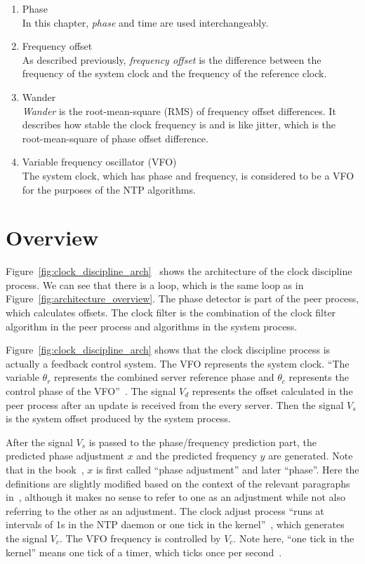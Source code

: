\begin{enumerate}
    \item Phase\\
        In this chapter, \emph{phase} and time are used interchangeably.
    \item Frequency offset\\
        As described previously, \emph{frequency offset} is the difference
        between the frequency of the system clock and the frequency of the
        reference clock.
    \item Wander\\
        \emph{Wander} is the root-mean-square (RMS) of frequency offset
        differences.  It describes how stable the clock frequency is and is
        like jitter, which is the root-mean-square of phase offset difference.
    \item Variable frequency oscillator (VFO)\\
        The system clock, which has phase and frequency, is considered to be a
        VFO for the purposes of the NTP algorithms.
\end{enumerate}

\section{Overview}%
\label{sec:clock_discipline_overview}
Figure~\ref{fig:clock_discipline_arch}~\cite{redbook} shows the architecture of
the clock discipline process. We can see that there is a loop, which is the
same loop as in Figure~\ref{fig:architecture_overview}. The phase detector is
part of the peer process, which calculates offsets. The clock filter is the
combination of the clock filter algorithm in the peer process and algorithms in
the system process.  

Figure~\ref{fig:clock_discipline_arch} shows that the
clock discipline process is actually a feedback control system. The VFO
represents the system clock.  ``The variable $\theta_r$ represents the combined
server reference phase and $\theta_c$ represents the control phase of the
VFO''~\cite{redbook}. The signal $V_d$ represents the offset calculated in the
peer process after an update is received from the every server. Then the signal
$V_s$ is the system offset produced by the system process. 

After the signal
$V_s$ is passed to the phase/frequency prediction part, the predicted phase
adjustment $x$ and the predicted frequency $y$ are generated. Note that in the
book~\cite{redbook}, $x$ is first called ``phase adjustment'' and later
``phase''. Here the definitions are slightly modified based on the context of
the relevant paragraphs in~\cite{redbook}, although it makes no sense to refer
to one as an adjustment while not also referring to the other as an adjustment.
The clock adjust process ``runs at intervals of 1s in the NTP daemon or one
tick in the kernel''~\cite{redbook}, which generates the signal $V_c$. The VFO
frequency is controlled by $V_c$. Note here, ``one tick in the kernel'' means
one tick of a timer, which ticks once per second~\cite{rfc5905}.


